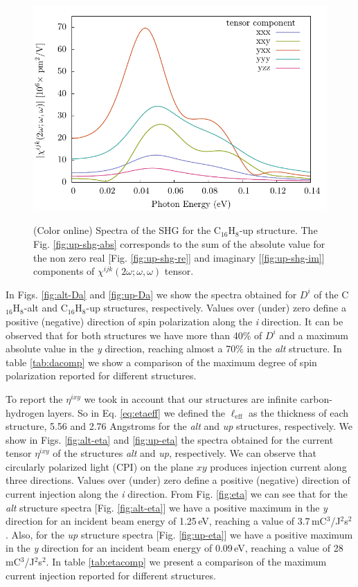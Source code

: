 \documentclass[aps,pra,11pt,tightenlines,showpacs,superscriptaddress,groupedaddress]{revtex4-1}
\newcommand{\lw}{0.55\linewidth}
\newcommand{\di}{$D^{i}$}
\newcommand{\ea}{$\eta^{ixy}$}
\newcommand{\altstc}{C$_{16}$H$_{8}$-alt}
\newcommand{\upstc}{C$_{16}$H$_{8}$-up}
\begin{document}
\begin{figure}
{            \includegraphics[width=\lw]{up/up_shg_final_abs_sm}}
    \caption{(Color online) Spectra of the SHG for the {\upstc} structure. The
    Fig. \ref{fig:up-shg-abs} corresponds to the sum of the absolute value for
    the non zero real [Fig. \ref{fig:up-shg-re}] and imaginary 
    [\ref{fig:up-shg-im}] components of $\chi^{ijk}(2\omega;\omega,\omega) $ 
    tensor.}\label{fig:shg-up}
\end{figure}


In Figs. \ref{fig:alt-Da} and \ref{fig:up-Da} we show the spectra obtained for
{\di} of the {\altstc} and {\upstc} structures, respectively. Values over
(under) zero define a positive (negative) direction of spin polarization along
the \emph{i} direction. It can be observed that for both structures we have
more than 40\% of {\di} and a maximum absolute value in the \emph{y} direction,
reaching almost a 70\% in the \emph{alt} structure. In table \ref{tab:dacomp}
we show a comparison of the maximum degree of spin polarization reported for
different structures.

To report the {\ea} we took in account that our structures are infinite carbon-
hydrogen layers. So in Eq. \ref{eq:etaeff} we defined the $\ell_{\text{eff}}$
as the thickness of each structure, 5.56 and 2.76 Angstroms for the \emph{alt}
and \emph{up} structures, respectively. We show in Figs. \ref{fig:alt-eta} and
\ref{fig:up-eta}  the spectra obtained for the current tensor {\ea} of the
structures \emph{alt} and \emph{up}, respectively. We can observe that
circularly polarized light (CPI) on the plane $xy$ produces injection current
along three directions. Values over (under) zero define a positive (negative)
direction of current injection along the \emph{i} direction. From Fig.
\ref{fig:eta} we can see that for the \emph{alt} structure spectra [Fig.
\ref{fig:alt-eta}] we have a positive maximum in the \emph{y} direction for an
incident beam energy of 1.25\,eV, reaching a value of
3.7\,mC$^{3}$/J$^{2}$s$^{2}$ . Also, for the \emph{up} structure spectra [Fig.
\ref{fig:up-eta}] we have a positive maximum in the \emph{y} direction for an
incident beam energy of 0.09\,eV, reaching a value of
28\,mC$^{3}$/J$^{2}$s$^{2}$. In table \ref{tab:etacomp} we present a comparison
of the maximum current injection reported for different structures.
\end{document}
